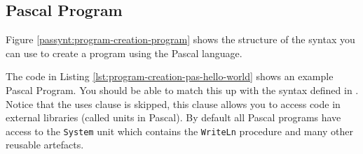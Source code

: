 \clearpage
\subsection{Pascal Program} %
\label{sub:program_in_pas}

Figure \ref{passynt:program-creation-program} shows the structure of the syntax you can use to create a program using the Pascal language.


The code in Listing \ref{lst:program-creation-pas-hello-world} shows an example Pascal Program. You should be able to match this up with the syntax defined in . Notice that the uses clause is skipped, this clause allows you to access code in external libraries (called units in Pascal). By default all Pascal programs have access to the \texttt{System} unit which contains the \texttt{WriteLn} procedure and many other reusable artefacts.



